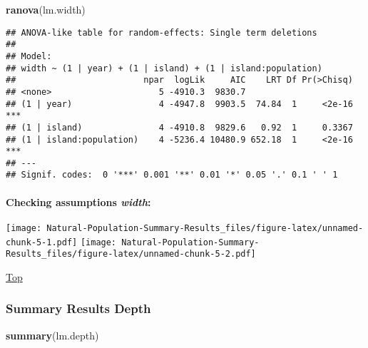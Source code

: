 \documentclass[
]{article}
\newenvironment{Shaded}{\begin{snugshade}}{\end{snugshade}}
\newcommand{\KeywordTok}[1]{\textcolor[rgb]{0.13,0.29,0.53}{\textbf{#1}}}
\newcommand{\NormalTok}[1]{#1}
\begin{document}
\begin{Shaded}
\begin{Highlighting}[]
\KeywordTok{ranova}\NormalTok{(lm.width)}
\end{Highlighting}
\end{Shaded}

\begin{verbatim}
## ANOVA-like table for random-effects: Single term deletions
## 
## Model:
## width ~ (1 | year) + (1 | island) + (1 | island:population)
##                         npar  logLik     AIC    LRT Df Pr(>Chisq)    
## <none>                     5 -4910.3  9830.7                         
## (1 | year)                 4 -4947.8  9903.5  74.84  1     <2e-16 ***
## (1 | island)               4 -4910.8  9829.6   0.92  1     0.3367    
## (1 | island:population)    4 -5236.4 10480.9 652.18  1     <2e-16 ***
## ---
## Signif. codes:  0 '***' 0.001 '**' 0.01 '*' 0.05 '.' 0.1 ' ' 1
\end{verbatim}

\hypertarget{checking-assumptions-width}{%
\paragraph{\texorpdfstring{Checking assumptions
\emph{width}:}{Checking assumptions width:}}\label{checking-assumptions-width}}

\texttt{[image: Natural-Population-Summary-Results\_files/figure-latex/unnamed-chunk-5-1.pdf]}
\texttt{[image: Natural-Population-Summary-Results\_files/figure-latex/unnamed-chunk-5-2.pdf]}

\protect\hyperlink{generalized-linear-model}{Top}

\hypertarget{summary-results-depth}{%
\subsubsection{Summary Results Depth}\label{summary-results-depth}}

\begin{Shaded}
\begin{Highlighting}[]
\KeywordTok{summary}\NormalTok{(lm.depth)}
\end{Highlighting}
\end{Shaded}
\end{document}
